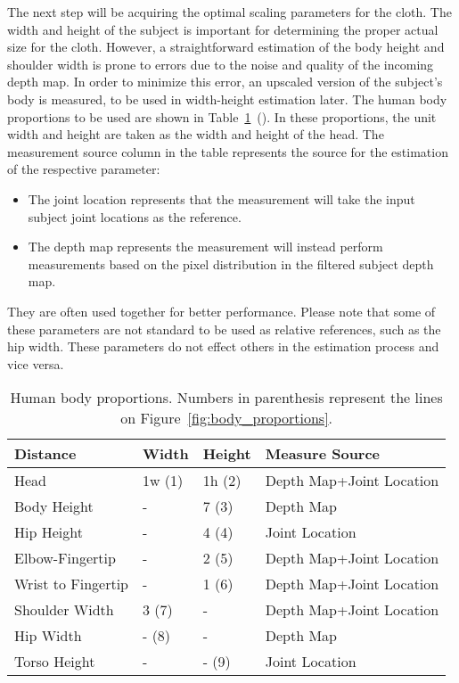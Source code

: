 The next step will be acquiring the optimal scaling parameters for the cloth. The width and height of the subject is important for determining the proper actual size for the cloth. However, a straightforward estimation of the body height and shoulder width is prone to errors due to the noise and quality of the incoming depth map. In order to minimize this error, an upscaled version of the subject's body is measured, to be used in width-height estimation later. The human body proportions to be used are shown in Table~\ref{tbl:human_body_proportions}~(\cite{Willis2012}). In these proportions, the unit width and height are taken as the width and height of the head. The measurement source column in the table represents the source for the estimation of the respective parameter:
\begin{itemize} 
\item
The joint location represents that the measurement will take the input subject joint locations as the reference.
\item 
The depth map represents the measurement will instead perform measurements based on the pixel distribution in the filtered subject depth map. 
\end{itemize}
They are often used together for better performance. Please note that some of these parameters are not standard to be used as relative references, such as the hip width. These parameters do not effect others in the estimation process and vice versa.

\begin{table}
\center
\begin{tabular}{ | l | l | l | l |}
\hline
\textbf{Distance} & \textbf{Width} & \textbf{Height} & \textbf{Measure Source} \\ \hline
Head & 1w (1) & 1h (2) & Depth Map+Joint Location \\ \hline
Body Height & - & 7 (3) & Depth Map \\ \hline
Hip Height & - & 4 (4) & Joint Location \\ \hline
Elbow-Fingertip & - & 2 (5) & Depth Map+Joint Location \\ \hline
Wrist to Fingertip & - & 1 (6) & Depth Map+Joint Location \\ \hline
Shoulder Width & 3 (7) & - & Depth Map+Joint Location \\ \hline
Hip Width & - (8) & - & Depth Map \\ \hline
Torso Height & - & - (9) & Joint Location \\ 
\hline
\end{tabular}
\caption{Human body proportions. Numbers in parenthesis represent the lines on Figure~\ref{fig:body_proportions}.}
\label{tbl:human_body_proportions}
\end{table}

